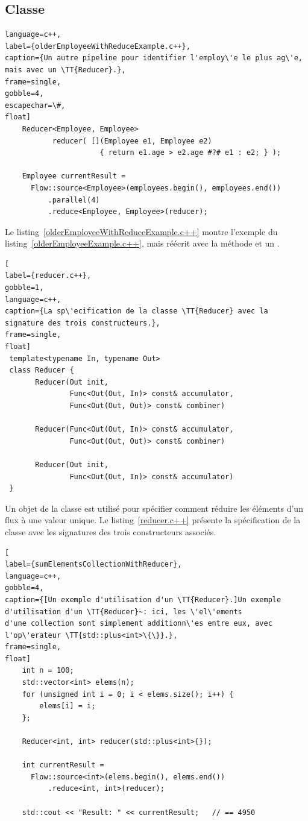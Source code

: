 \subsection{Classe }

\label{reducer.sect}

\begin{lstlisting}
language=c++,
label={olderEmployeeWithReduceExample.c++},
caption={Un autre pipeline pour identifier l'employ\'e le plus ag\'e, mais avec un \TT{Reducer}.},
frame=single,
gobble=4,
escapechar=\#,
float]
    Reducer<Employee, Employee> 
           reducer( [](Employee e1, Employee e2) 
                      { return e1.age > e2.age #?# e1 : e2; } );

    Employee currentResult =
      Flow::source<Employee>(employees.begin(), employees.end())
          .parallel(4)
          .reduce<Employee, Employee>(reducer);
\end{lstlisting}



Le listing~\ref{olderEmployeeWithReduceExample.c++} montre l'exemple du listing~\ref{olderEmployeeExample.c++}, mais r\'e\'ecrit avec la m\'ethode  et un .


\begin{lstlisting}[
label={reducer.c++},
gobble=1,
language=c++,
caption={La sp\'ecification de la classe \TT{Reducer} avec la signature des trois constructeurs.},
frame=single,
float]
 template<typename In, typename Out>
 class Reducer {
       Reducer(Out init, 
               Func<Out(Out, In)> const& accumulator,
               Func<Out(Out, Out)> const& combiner)

       Reducer(Func<Out(Out, In)> const& accumulator,
               Func<Out(Out, Out)> const& combiner)

       Reducer(Out init, 
               Func<Out(Out, In)> const& accumulator)
 }
\end{lstlisting}


Un objet de la classe  est utilis\'e pour sp\'ecifier comment r\'eduire les \'el\'ements d'un flux \`a une valeur unique. Le listing~\ref{reducer.c++} présente la spécification  de la classe  avec les signatures des trois constructeurs associ\'es. 


\begin{lstlisting}[
label={sumElementsCollectionWithReducer},
language=c++,
gobble=4,
caption={[Un exemple d'utilisation d'un \TT{Reducer}.]Un exemple
d'utilisation d'un \TT{Reducer}~: ici, les \'el\'ements
d'une collection sont simplement additionn\'es entre eux, avec
l'op\'erateur \TT{std::plus<int>\{\}}.},
frame=single,
float]
    int n = 100;
    std::vector<int> elems(n);
    for (unsigned int i = 0; i < elems.size(); i++) {
        elems[i] = i;
    };

    Reducer<int, int> reducer(std::plus<int>{});

    int currentResult =
      Flow::source<int>(elems.begin(), elems.end())
          .reduce<int, int>(reducer);

	std::cout << "Result: " << currentResult;	// == 4950   
\end{lstlisting}


